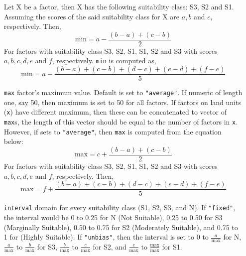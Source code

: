 \documentclass[11pt,fleqn]{article}\usepackage[]{graphicx}\usepackage[]{color}
\begin{document}
\begin{itemize}[leftmargin=\dimexpr\linewidth-11.8cm-\rightmargin\relax]
Let X be a factor, then X has the following suitability class: S3, S2 and S1. Assuming the scores of the said suitability class for X are $a, b$ and $c$, respectively. Then,
$$\mathrm{min} = a - \displaystyle\frac{(b - a) + (c - b)}{2}$$
For factors with suitability class S3, S2, S1, S1, S2 and S3 with scores $a, b, c, d, e$ and $f$, respectively. \verb|min| is computed as,
$$\mathrm{min} = a - \displaystyle\frac{(b - a) + (c - b) + (d - c) + (e - d) + (f - e)}{5}$$
\item[\texttt{max}] factor's maximum value. Default is set to \verb|"average"|. If numeric of length one, say 50, then maximum is set to 50 for all factors. If factors on land units (\verb|x|) have different maximum, then these can be concatenated to vector of \verb|max|s, the length of this vector should be equal to the number of factors in \verb|x|. However, if sets to \verb|"average"|, then \verb|max| is computed from the equation below:
$$\mathrm{max}=c + \displaystyle\frac{(b-a) + (c-b)}{2}$$
For factors with suitability class S3, S2, S1, S1, S2 and S3 with scores $a, b, c, d, e$ and $f$, respectively. Then,
$$\mathrm{max} = f + \displaystyle\frac{(b - a) + (c - b) + (d - c) + (e - d) + (f - e)}{5}$$
\item[\texttt{interval}] domain for every suitability class (S1, S2, S3, and N). If \verb|"fixed"|, the interval would be 0 to 0.25 for N (Not Suitable), 0.25 to 0.50 for S3 (Marginally Suitable), 0.50 to 0.75 for S2 (Moderately Suitable), and 0.75 to 1 for (Highly Suitable). If \verb|"unbias"|, then the interval is set to 0 to $\displaystyle\frac{a}{\mathrm{max}}$ for N, $\displaystyle\frac{a}{\mathrm{max}}$ to $\displaystyle\frac{b}{\mathrm{max}}$ for S3, $\displaystyle\frac{b}{\mathrm{max}}$ to $\displaystyle\frac{c}{\mathrm{max}}$ for S2, and $\displaystyle\frac{c}{\mathrm{max}}$ to $\displaystyle\frac{\mathrm{max}}{\mathrm{max}}$ for S1.
\end{itemize}
\end{document}
